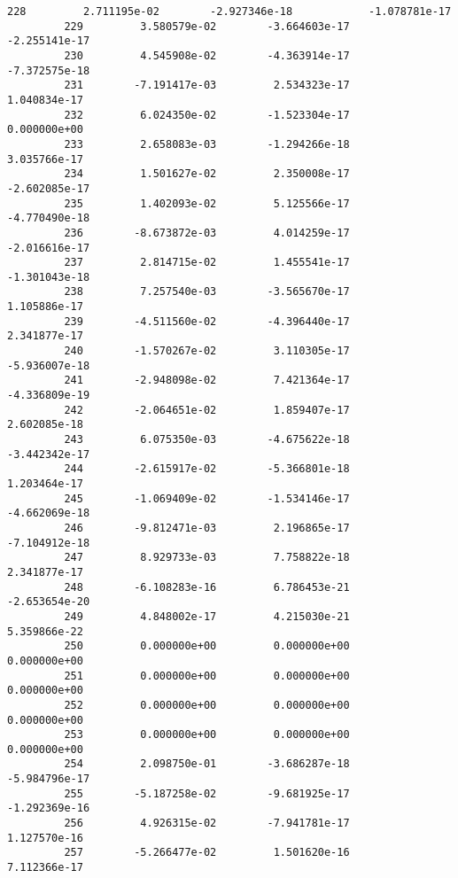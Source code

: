 \documentclass[11pt]{article}
\begin{document}
\begin{Verbatim}[commandchars=\\\{\}]
         228         2.711195e-02        -2.927346e-18            -1.078781e-17   
         229         3.580579e-02        -3.664603e-17            -2.255141e-17   
         230         4.545908e-02        -4.363914e-17            -7.372575e-18   
         231        -7.191417e-03         2.534323e-17             1.040834e-17   
         232         6.024350e-02        -1.523304e-17             0.000000e+00   
         233         2.658083e-03        -1.294266e-18             3.035766e-17   
         234         1.501627e-02         2.350008e-17            -2.602085e-17   
         235         1.402093e-02         5.125566e-17            -4.770490e-18   
         236        -8.673872e-03         4.014259e-17            -2.016616e-17   
         237         2.814715e-02         1.455541e-17            -1.301043e-18   
         238         7.257540e-03        -3.565670e-17             1.105886e-17   
         239        -4.511560e-02        -4.396440e-17             2.341877e-17   
         240        -1.570267e-02         3.110305e-17            -5.936007e-18   
         241        -2.948098e-02         7.421364e-17            -4.336809e-19   
         242        -2.064651e-02         1.859407e-17             2.602085e-18   
         243         6.075350e-03        -4.675622e-18            -3.442342e-17   
         244        -2.615917e-02        -5.366801e-18             1.203464e-17   
         245        -1.069409e-02        -1.534146e-17            -4.662069e-18   
         246        -9.812471e-03         2.196865e-17            -7.104912e-18   
         247         8.929733e-03         7.758822e-18             2.341877e-17   
         248        -6.108283e-16         6.786453e-21            -2.653654e-20   
         249         4.848002e-17         4.215030e-21             5.359866e-22   
         250         0.000000e+00         0.000000e+00             0.000000e+00   
         251         0.000000e+00         0.000000e+00             0.000000e+00   
         252         0.000000e+00         0.000000e+00             0.000000e+00   
         253         0.000000e+00         0.000000e+00             0.000000e+00   
         254         2.098750e-01        -3.686287e-18            -5.984796e-17   
         255        -5.187258e-02        -9.681925e-17            -1.292369e-16   
         256         4.926315e-02        -7.941781e-17             1.127570e-16   
         257        -5.266477e-02         1.501620e-16             7.112366e-17   
         

\end{Verbatim}
\end{document}
